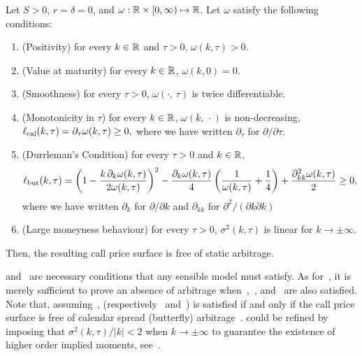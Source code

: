 \begin{proposition}{\citet[Theorem~2.9]{roper2010arbitrage}} \label{prop:noAO}
Let $S>0$, $r=\delta=0$, and $\omega:{\mathbb R} \times [0,\infty) \mapsto {\mathbb R}$.
Let $\omega$ satisfy the following conditions:
\begin{enumerate}[label={C\arabic*)}, noitemsep, topsep=0pt]
\item \label{cons:posi} (Positivity) for every $k\in{\mathbb R}$ and $\tau>0$,
$
\omega(k,\tau)>0.
$
\item \label{cons:vmat} (Value at maturity) for every $k\in{\mathbb R}$,
$
\omega(k,0)=0.
$
\item \label{cons:smoo} (Smoothness) for every $\tau>0$, $\omega(\cdot, \, \tau)$ is twice differentiable.
\item \label{cons:mono} (Monotonicity in $\tau$) for every $k\in{\mathbb R}$, $\omega(k, \, \cdot)$ is non-decreasing,
$
\ell_{\rm cal}(k,\tau) = \partial_\tau \omega(k,\tau) \ge 0,
$
where we have written $\partial_\tau$ for $\partial/\partial \tau$.
\item \label{cons:durr} (Durrleman's Condition) for every $\tau>0$ and $k\in{\mathbb R}$,
$$
\ell_{\rm but}(k,\tau) = \left( 1 - \frac{k \, \partial_k \omega(k,\tau)}{2 \omega(k,\tau)}\right)^2 - \frac{\partial_k \omega(k,\tau)}{4} \left(\frac{1}{\omega(k,\tau)} + \frac{1}{4}\right) + \frac{\partial^2_{kk}\omega(k,\tau)}{2} \ge 0,
$$
where we have written $\partial_k$ for $\partial/\partial k$ and $\partial_{kk}$ for $\partial^2/(\partial k\partial k)$
\item \label{cons:asym} (Large moneyness behaviour) for every $\tau>0$, $\sigma^2(k,\tau)$ is linear for $k\rightarrow \pm \infty$.
\end{enumerate} 
Then, the resulting call price surface is free of static arbitrage.
\end{proposition}

 and~ are necessary conditions that any sensible model must satisfy.
As for~, it is merely sufficient to prove an absence of arbitrage when~,~, and~ are also satisfied.
Note that, assuming~,  (respectively~ and~) is satisfied if and only if the call price surface is free of calendar spread (butterfly) arbitrage~\cite{gatheral2014arbitrage}.
 could be refined by imposing that $\sigma^2(k,\tau)/ \lvert k \rvert < 2$ when $k\rightarrow \pm \infty$ to guarantee the existence of higher order implied moments, see~\cite{lee2004moment,benaim2009regular}.

